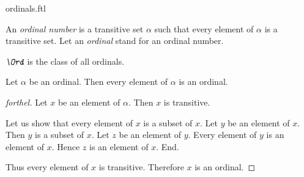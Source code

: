 \documentclass{stex}
\begin{document}
\begin{smodule}{ordinals.ftl}

\begin{definition}[forthel]
  An \emph{ordinal number} is a transitive set $\alpha$ such that every element of $\alpha$ is a transitive set.
  Let an \emph{ordinal} stand for an ordinal number.
\end{definition}

\begin{definition}[forthel]
  $\emph{\Ord}$ is the class of all ordinals.
\end{definition}

\begin{proposition}[forthel]
  Let $\alpha$ be an ordinal.
  Then every element of $\alpha$ is an ordinal.
\end{proposition}
\begin{proof}[forthel]
  Let $x$ be an element of $\alpha$.
  Then $x$ is transitive.

  Let us show that every element of $x$ is a subset of $x$.
    Let $y$ be an element of $x$.
    Then $y$ is a subset of $x$.
    Let $z$ be an element of $y$.
    Every element of $y$ is an element of $x$.
    Hence $z$ is an element of $x$.
  End.

  Thus every element of $x$ is transitive.
  Therefore $x$ is an ordinal.
\end{proof}
\end{smodule}
\end{document}
